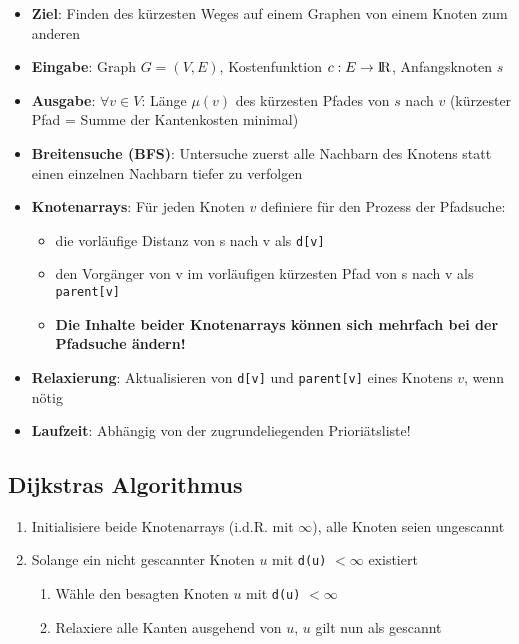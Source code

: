 \documentclass[10pt,a4paper]{article}
\def\realnumbers{{\rm I\!R}}
\begin{document}
	\begin{itemize}
		\item \textbf{Ziel}: Finden des kürzesten Weges auf einem Graphen von einem Knoten zum anderen
		\item \textbf{Eingabe}: Graph $G = (V,E)$, Kostenfunktion $c: E \rightarrow \realnumbers$, Anfangsknoten $s$
		\item \textbf{Ausgabe}: $\forall v \in V$: Länge $\mu(v)$ des kürzesten Pfades von $s$ nach $v$ (kürzester Pfad = Summe der Kantenkosten minimal)
		\item \textbf{Breitensuche (BFS)}: Untersuche zuerst alle Nachbarn des Knotens statt einen einzelnen Nachbarn tiefer zu verfolgen
		\item \textbf{Knotenarrays}: Für jeden Knoten $v$ definiere für den Prozess der Pfadsuche:
		\begin{itemize}
			\item die vorläufige Distanz von s nach v als \texttt{d[v]}
			\item den Vorgänger von v im vorläufigen kürzesten Pfad von s nach v als \texttt{parent[v]}
			\item \textbf{Die Inhalte beider Knotenarrays können sich mehrfach bei der Pfadsuche ändern!}
		\end{itemize}
		\item \textbf{Relaxierung}: Aktualisieren von \texttt{d[v]} und \texttt{parent[v]} eines Knotens $v$, wenn nötig
		\item \textbf{Laufzeit}: Abhängig von der zugrundeliegenden Prioriätsliste!
	\end{itemize}

	\subsection{Dijkstras Algorithmus}
	\label{sp:sub:dijkstras_algorithmus}
	
	\begin{enumerate}
		\item Initialisiere beide Knotenarrays (i.d.R. mit $\infty$), alle Knoten seien ungescannt
		\item Solange ein nicht gescannter Knoten $u$ mit \texttt{d(u)} $< \infty$ existiert
		\begin{enumerate}
			\item Wähle den besagten Knoten $u$ mit \texttt{d(u)} $< \infty$
			\item Relaxiere alle Kanten ausgehend von $u$, $u$ gilt nun als gescannt
		\end{enumerate}
	\end{enumerate}
\end{document}
